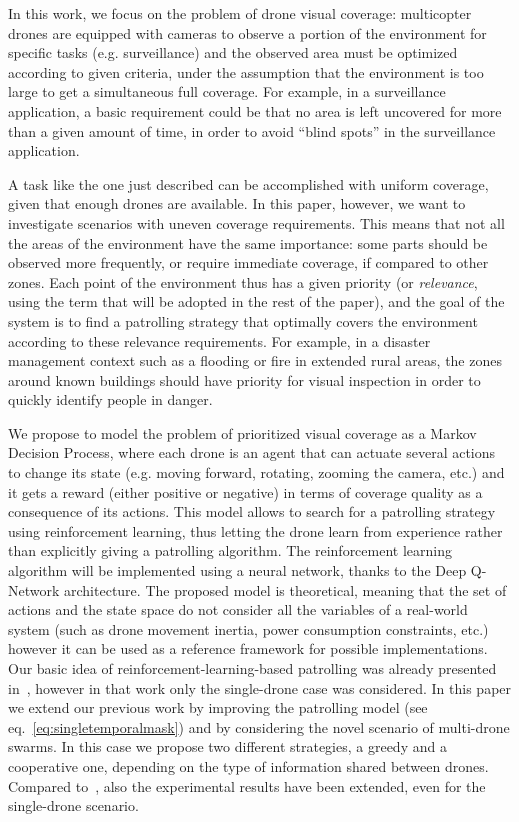 \documentclass{article}
\begin{document}
In this work, we focus on the problem of drone visual coverage: multicopter drones are equipped with cameras to observe a portion of the environment for specific tasks (e.g. surveillance) and the observed area must be optimized according to given criteria, under the assumption that the environment is too large to get a simultaneous full coverage. For example, in a surveillance application, a basic requirement could be that no area is left uncovered for more than a given amount of time, in order to avoid ``blind spots'' in the surveillance application.

A task like the one just described can be accomplished with uniform coverage, given that enough drones are available. In this paper, however, we want to investigate scenarios with uneven coverage requirements. This means that not all the areas of the environment have the same importance: some parts should be observed more frequently, or require immediate coverage, if compared to other zones. Each point of the environment thus has a given priority (or \emph{relevance}, using the term that will be adopted in the rest of the paper), and the goal of the system is to find a patrolling strategy that optimally covers the environment according to these relevance requirements. For example, in a disaster management context such as a flooding or fire in extended rural areas, the zones around known buildings should have priority for visual inspection in order to quickly identify people in danger.

We propose to model the problem of prioritized visual coverage as a Markov Decision Process, where each drone is an agent that can actuate several actions to change its state (e.g. moving forward, rotating, zooming the camera, etc.) and it gets a reward (either positive or negative) in terms of coverage quality as a consequence of its actions. This model allows to search for a patrolling strategy using reinforcement learning, thus letting the drone learn from experience rather than explicitly giving a patrolling algorithm. The reinforcement learning algorithm will be implemented using a neural network, thanks to the Deep Q-Network architecture. The proposed model is theoretical, meaning that the set of actions and the state space do not consider all the variables of a real-world system (such as drone movement inertia, power consumption constraints, etc.) however it can be used as a reference framework for possible implementations. Our basic idea of reinforcement-learning-based patrolling was already presented in~\cite{piciarelli19-drone}, however in that work only the single-drone case was considered. In this paper we extend our previous work by improving the patrolling model (see eq.~\ref{eq:singletemporalmask}) and by considering the novel scenario of multi-drone swarms. In this case we propose two different strategies, a greedy and a cooperative one, depending on the type of information shared between drones. Compared to~\cite{piciarelli19-drone}, also the experimental results have been extended, even for the single-drone scenario.
\end{document}
